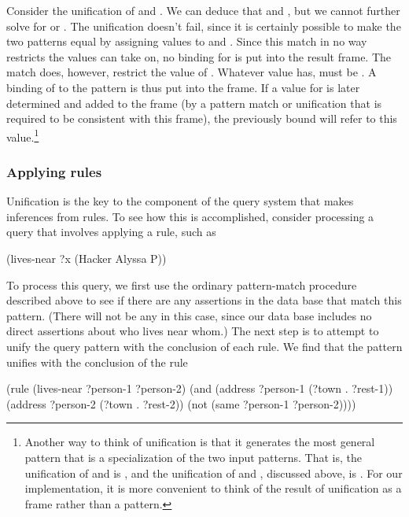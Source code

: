 Consider the unification of  and .  We can
deduce that  and , but we cannot further solve
for  or .  The unification doesn't fail, since it is
certainly possible to make the two patterns equal by assigning values to
 and .  Since this match in no way restricts the values
 can take on, no binding for  is put into the result frame.
The match does, however, restrict the value of .  Whatever value
 has,  must be .  A binding of  to the
pattern  is thus put into the frame.  If a value for  is
later determined and added to the frame (by a pattern match or unification that
is required to be consistent with this frame), the previously bound 
will refer to this value.\footnote{Another way to think of unification is that
it generates the most general pattern that is a specialization of the two input
patterns.  That is, the unification of  and  is
, and the unification of  and , discussed above, is .  For our implementation, it is more
convenient to think of the result of unification as a frame rather than a
pattern.}

\subsubsection*{Applying rules}

Unification is the key to the component of the query system that makes
inferences from rules. To see how this is accomplished, consider processing a
query that involves applying a rule, such as

\begin{codeBlock}
(lives-near ?x (Hacker Alyssa P))
\end{codeBlock}

\noindent
To process this query, we first use the ordinary pattern-match procedure
described above to see if there are any assertions in the data base that match
this pattern.  (There will not be any in this case, since our data base
includes no direct assertions about who lives near whom.)  The next step is to
attempt to unify the query pattern with the conclusion of each rule.  We find
that the pattern unifies with the conclusion of the rule

\begin{codeBlock}
(rule (lives-near ?person-1 ?person-2)
      (and (address ?person-1 (?town . ?rest-1))
           (address ?person-2 (?town . ?rest-2))
           (not (same ?person-1 ?person-2))))
\end{codeBlock}

